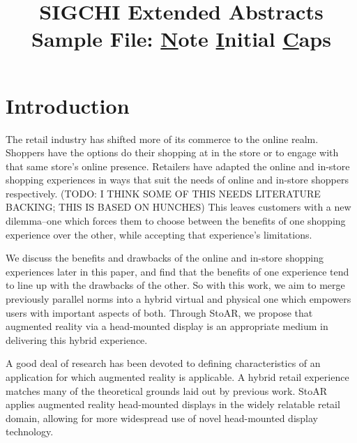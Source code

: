 \documentclass{sigchi-ext}
\begin{document}
\title{SIGCHI Extended Abstracts Sample File: \underline{N}ote
  \underline{I}nitial \underline{C}aps}

\section{Introduction}

The retail industry has shifted more of its commerce to the online realm.  Shoppers have the options do their shopping at in the store or to engage with that same store's online presence.  Retailers have adapted the online and in-store shopping experiences in ways that suit the needs of online and in-store shoppers respectively.  (TODO:  I THINK SOME OF THIS NEEDS LITERATURE BACKING; THIS IS BASED ON HUNCHES)  This leaves customers with a new dilemma--one which forces them to choose between the benefits of one shopping experience over the other, while accepting that experience's limitations.

We discuss the benefits and drawbacks of the online and in-store shopping experiences later in this paper, and find that the benefits of one experience tend to line up with the drawbacks of the other.  So with this work, we aim to merge previously parallel norms into a hybrid virtual and physical one which empowers users with important aspects of both.  Through StoAR, we propose that augmented reality via a head-mounted display is an appropriate medium in delivering this hybrid experience.

A good deal of research has been devoted to defining characteristics of an application for which augmented reality is applicable.  A hybrid retail experience matches many of the theoretical grounds laid out by previous work.  StoAR applies augmented reality head-mounted displays in the widely relatable retail domain, allowing for more widespread use of novel head-mounted display technology.
\end{document}
